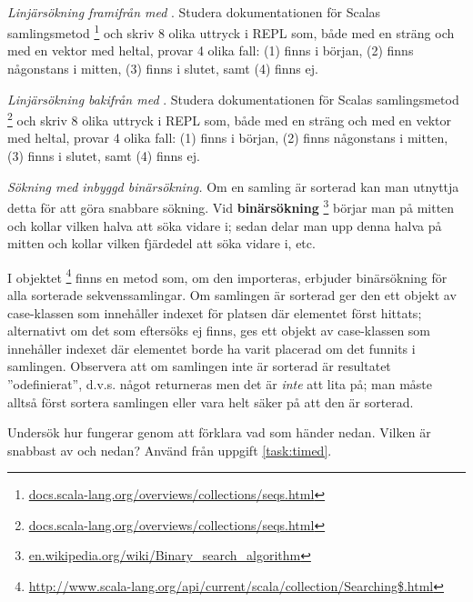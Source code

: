 \QUESTBEGIN

\Task  \what~

\Subtask \emph{Linjärsökning framifrån med }. Studera dokumentationen för Scalas samlingsmetod \footnote{\href{http://docs.scala-lang.org/overviews/collections/seqs.html}{docs.scala-lang.org/overviews/collections/seqs.html}} och skriv 8 olika uttryck i REPL som, både med en sträng och med en vektor med heltal, provar 4 olika fall: (1) finns i början, (2) finns någonstans i mitten, (3) finns i slutet, samt (4) finns ej.

\Subtask \emph{Linjärsökning bakifrån med }. Studera dokumentationen för Scalas samlingsmetod \footnote{\href{http://docs.scala-lang.org/overviews/collections/seqs.html}{docs.scala-lang.org/overviews/collections/seqs.html}} och skriv 8 olika uttryck i REPL som, både med en sträng och med en vektor med heltal, provar 4 olika fall: (1) finns i början, (2) finns någonstans i mitten, (3) finns i slutet, samt (4) finns ej.

\Subtask \emph{Sökning med inbyggd binärsökning.} Om en samling är sorterad kan man utnyttja detta för att göra snabbare sökning. Vid \textbf{binärsökning} \footnote{\label{footnote:binarysearch}\href{https://en.wikipedia.org/wiki/Binary_search_algorithm}{en.wikipedia.org/wiki/Binary\_search\_algorithm}} börjar man på mitten och kollar vilken halva att  söka vidare i; sedan delar man upp denna halva på mitten och kollar vilken fjärdedel att söka vidare i, etc.

I objektet \footnote{\href{http://www.scala-lang.org/api/current/scala/collection/Searching\$.html}{http://www.scala-lang.org/api/current/scala/collection/Searching\$.html}} finns en metod  som, om den importeras, erbjuder binärsökning för alla sorterade sekvenssamlingar. Om samlingen är sorterad ger den ett objekt av case-klassen  som innehåller indexet för platsen där elementet först hittats; alternativt om det som eftersöks ej finns, ges ett objekt av case-klassen  som innehåller indexet där elementet borde ha varit placerad om det funnits i samlingen. Observera att om samlingen inte är sorterad är resultatet ''odefinierat'', d.v.s. något returneras men det är \emph{inte} att lita på; man måste alltså först sortera samlingen eller vara helt säker på att den är sorterad.

Undersök hur  fungerar genom att förklara vad som händer nedan. Vilken är snabbast av  och  nedan? Använd  från uppgift \ref{task:timed}.

